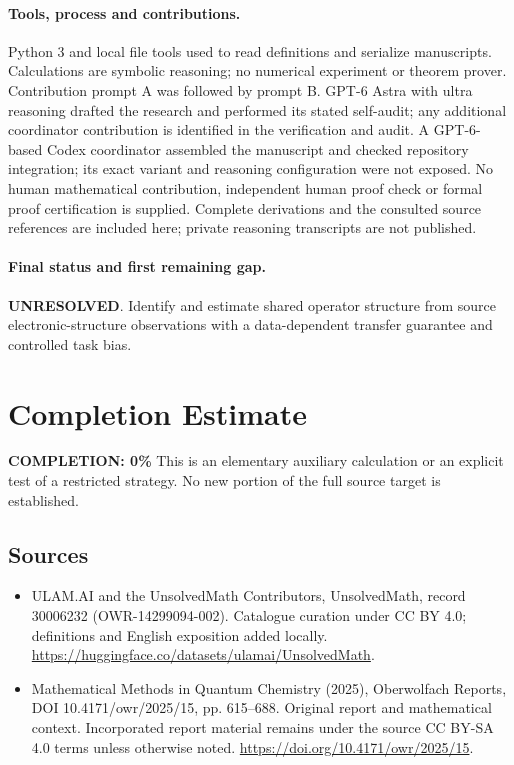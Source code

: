 \documentclass[11pt]{article}
\begin{document}
\paragraph{Tools, process and contributions.}
Python 3 and local file tools used to read definitions and serialize manuscripts. Calculations are symbolic reasoning; no numerical experiment or theorem prover. Contribution prompt A was followed by prompt B. GPT-6 Astra with ultra reasoning drafted the research and performed its stated self-audit; any additional coordinator contribution is identified in the verification and audit. A GPT-6-based Codex coordinator assembled the manuscript and checked repository integration; its exact variant and reasoning configuration were not exposed. No human mathematical contribution, independent human proof check or formal proof certification is supplied. Complete derivations and the consulted source references are included here; private reasoning transcripts are not published.

\paragraph{Final status and first remaining gap.}
\textbf{UNRESOLVED}. Identify and estimate shared operator structure from source electronic-structure observations with a data-dependent transfer guarantee and controlled task bias.

\section{Completion Estimate}
\noindent\textbf{COMPLETION: 0\%}
This is an elementary auxiliary calculation or an explicit test of a restricted strategy. No new portion of the full source target is established.

\subsection{Sources}
\begin{itemize}
\item[\hypertarget{source:30006232:1}{S1}] ULAM.AI and the UnsolvedMath Contributors, UnsolvedMath, record 30006232 (OWR-14299094-002). Catalogue curation under CC BY 4.0; definitions and English exposition added locally.
\url{https://huggingface.co/datasets/ulamai/UnsolvedMath}.
\item[\hypertarget{source:30006232:2}{S2}] Mathematical Methods in Quantum Chemistry (2025), Oberwolfach Reports, DOI 10.4171/owr/2025/15, pp. 615--688. Original report and mathematical context. Incorporated report material remains under the source CC BY-SA 4.0 terms unless otherwise noted.
\url{https://doi.org/10.4171/owr/2025/15}.
\end{itemize}
\label{end:30006232}
\end{document}
